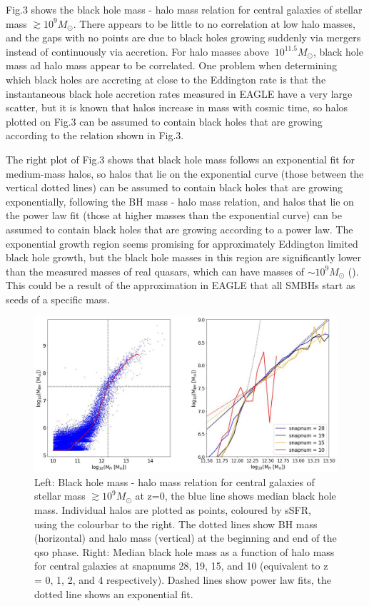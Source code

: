 \documentclass[12pt, twocolumn]{report}%
\begin{document}
Fig.3 shows the black hole mass - halo mass relation for central galaxies of stellar mass $\gtrsim10^9M_\odot$. There appears to be little to no correlation at low halo masses, and the gaps with no points are due to black holes growing suddenly via mergers instead of continuously via accretion. For halo masses above $~10^{11.5}M_\odot$, black hole mass ad halo mass appear to be correlated. One problem when determining which black holes are accreting at close to the Eddington rate is that the instantaneous black hole accretion rates measured in EAGLE have a very large scatter, but it is known that halos increase in mass with cosmic time, so halos plotted on Fig.3 can be assumed to contain black holes that are growing according to the relation shown in Fig.3.\par

The right plot of Fig.3 shows that black hole mass follows an exponential fit for medium-mass halos, so halos that lie on the exponential curve (those between the vertical dotted lines) can be assumed to contain black holes that are growing exponentially, following the BH mass - halo mass relation, and halos that lie on the power law fit (those at higher masses than the exponential curve) can be assumed to contain black holes that are growing according to a power law. The exponential growth region seems promising for approximately Eddington limited black hole growth, but the black hole masses in this region are significantly lower than the measured masses of real quasars, which can have masses of $\sim10^9M_\odot$ (\cite{Marshall}). This could be a result of the approximation in EAGLE that all SMBHs start as seeds of a specific mass.

\onecolumngrid


\begin{figure}[H]
\centering
\includegraphics[width=17cm]{Plot_3.jpeg}
\caption{Left: Black hole mass - halo mass relation for central galaxies of stellar mass $\gtrsim10^9M_\odot$ at z=0, the blue line shows median black hole mass. Individual halos are plotted as points, coloured by sSFR, using the colourbar to the right. The dotted lines show BH mass (horizontal) and halo mass (vertical) at the beginning and end of the qso phase. Right: Median black hole mass as a function of halo mass for central galaxies at snapnums 28, 19, 15, and 10 (equivalent to z = 0, 1, 2, and 4 respectively). Dashed lines show power law fits, the dotted line shows an exponential fit.}
\label{fig:3}
\end{figure}
\twocolumngrid
\end{document}
